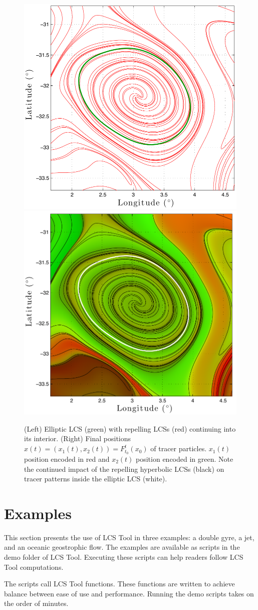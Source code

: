 \documentclass{elsarticle}
\begin{document}
\begin{figure}[hbt]
\centering
\includegraphics[width=.49\textwidth]{graphics/ocean_dataset/LCS_fwd_coherent_eddy}
\includegraphics[width=.49\textwidth]{graphics/ocean_dataset/LCS_fwd_colortracer}
\caption{(Left) Elliptic LCS (green) with repelling LCSs (red) continuing into its interior. (Right) Final positions $x(t) = (x_1(t),x_2(t)) = F_{t_0}^t(x_0)$ of tracer particles. $x_1(t)$ position encoded in red and $x_2(t)$ position encoded in green. Note the continued impact of the repelling hyperbolic LCSs (black) on tracer patterns inside the elliptic LCS (white).}
\label{f:ocean_dataset_colortracer}
\end{figure}

\section{Examples}

This section presents the use of LCS Tool in three examples: a double gyre, a jet, and an oceanic geostrophic flow. The examples are available as scripts in the demo folder of LCS Tool. Executing these scripts can help readers follow LCS Tool computations.

The scripts call LCS Tool functions.
These functions are written to achieve balance between ease of use and performance.
Running the demo scripts takes on the order of minutes.
\end{document}
